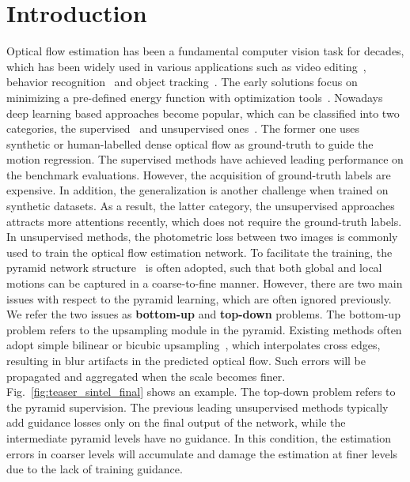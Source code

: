\documentclass[final]{cvpr}
\begin{document}
\section{Introduction}\label{sec:intro}
	Optical flow estimation has been a fundamental computer vision task for decades, which has been widely used in various applications such as video editing~\cite{Jiang_2018_CVPR}, behavior recognition~\cite{Simonyan2014} and object tracking~\cite{largemotion_network_design_iccv2017}. 
	The early solutions focus on minimizing a pre-defined energy function with optimization tools~\cite{Thomas2004,Sun2010,EpicFlow_2015}. Nowadays deep learning based approaches become popular, which can be classified into two categories, the supervised~\cite{FlowNet2,spynet2017} and unsupervised ones~\cite{Ren2017aaai,wang2018}. 
	The former one uses synthetic or human-labelled dense optical flow as ground-truth to guide the motion regression. 
	The supervised methods have achieved leading performance on the benchmark evaluations. However, the acquisition of ground-truth labels are expensive. In addition, the generalization is another challenge when trained on synthetic datasets. 
As a result, the latter category, \ie the unsupervised approaches attracts more attentions recently, which does not require the ground-truth labels. In unsupervised methods, the photometric loss between two images is commonly used to train the optical flow estimation network. To facilitate the training, the pyramid network structure~\cite{pwc_net,irrpwc} is often adopted, such that both global and local motions can be captured in a coarse-to-fine manner. 
However, there are two main issues with respect to the pyramid learning, which are often ignored previously. We refer the two issues as \textbf{bottom-up} and \textbf{top-down} problems.
The bottom-up problem refers to the upsampling module in the pyramid.
	Existing methods often adopt simple bilinear or bicubic upsampling~\cite{liu2020learning,jonschkowski2020matters}, which interpolates cross edges, resulting in blur artifacts in the predicted optical flow. Such errors will be propagated and aggregated when the scale becomes finer. 
	Fig.~\ref{fig:teaser_sintel_final} shows an example. 
	The top-down problem refers to the pyramid supervision. The previous leading unsupervised methods typically add guidance losses only on the final output of the network, while the intermediate pyramid levels have no guidance. In this condition, the estimation errors in coarser levels will accumulate and damage the estimation at finer levels due to the lack of training guidance. 
\end{document}
